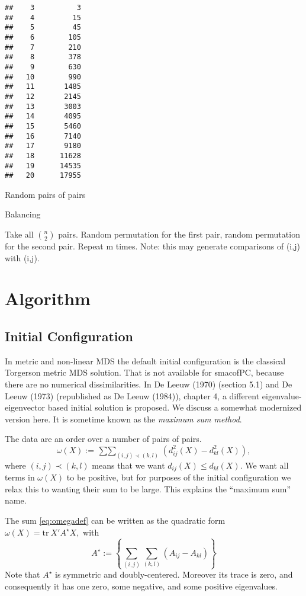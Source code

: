 \documentclass[
  12pt,
]{article}
\begin{document}
\begin{verbatim}
##    3          3 
##    4         15 
##    5         45 
##    6        105 
##    7        210 
##    8        378 
##    9        630 
##   10        990 
##   11       1485 
##   12       2145 
##   13       3003 
##   14       4095 
##   15       5460 
##   16       7140 
##   17       9180 
##   18      11628 
##   19      14535 
##   20      17955
\end{verbatim}

Random pairs of pairs

Balancing

Take all \(\binom{n}{2}\) pairs. Random permutation for the first pair,
random permutation for the second pair. Repeat m times. Note: this may
generate comparisons of (i,j) with (i,j).

\section{Algorithm}\label{algorithm}

\subsection{Initial Configuration}\label{initial-configuration}

In metric and non-linear MDS the default initial configuration is the
classical Torgerson metric MDS solution. That is not available for
smacofPC, because there are no numerical dissimilarities. In
De Leeuw (1970) (section 5.1) and De Leeuw (1973) (republished as De Leeuw (1984)), chapter 4, a different eigenvalue-eigenvector based initial solution is proposed. We discuss a somewhat modernized version here. It is sometime known as the \emph{maximum sum method}.

The data are an order over a number of pairs of pairs.
\begin{equation}
\omega(X):=\mathop{\sum\sum}_{(i,j)\prec(k,l)}(d_{ij}^2(X)-d_{kl}^2(X)),
\label{eq:omegadef}
\end{equation}
where \((i,j)\prec(k,l)\) means that we want \(d_{ij}(X)\leq d_{kl}(X)\).
We want all terms in \(\omega(X)\) to be positive, but for purposes of
the initial configuration we relax this to wanting their sum to be
large. This explains the ``maximum sum'' name.

The sum \eqref{eq:omegadef} can be written as the quadratic form
\(\omega(X)=\text{tr}\ X'A^\star X,\)
with
\begin{equation}
A^\star:=\left\{\sum_{(i,j)}\sum_{(k,l)}(A_{ij}-A_{kl})\right\} 
\label{eq:astardef}
\end{equation}
Note that \(A^\star\) is symmetric and doubly-centered. Moreover
its trace is zero, and consequently it has one zero, some negative,
and some positive eigenvalues.
\end{document}
